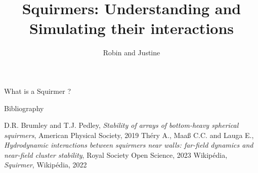 \documentclass{beamer}
\title{Squirmers: Understanding and Simulating their interactions}
\author{Robin and Justine}
\begin{document}
\begin{frame}
    \titlepage
\end{frame}

\begin{frame}{What is a Squirmer ?}
    
\end{frame}

\begin{frame}{Bibliography}
    \begin{thebibliography}{3}
         D.R. Brumley and T.J. Pedley, \emph{Stability of arrays of bottom-heavy spherical squirmers}, American Physical Society, 2019
         Théry A., Maaß C.C. and Lauga E., \emph{Hydrodynamic interactions between squirmers near walls: far-field dynamics and near-field cluster stability}, Royal Society Open Science, 2023
         Wikipédia, \emph{Squirmer}, Wikipédia, 2022
    \end{thebibliography}
\end{frame}
\end{document}
